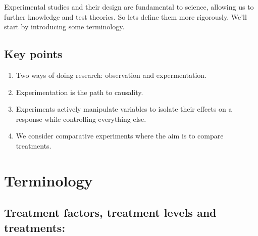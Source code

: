 \documentclass[
  letterpaper,
]{book}
\providecommand{\tightlist}{%
  \setlength{\itemsep}{0pt}\setlength{\parskip}{0pt}}\usepackage{longtable,booktabs,array}
\begin{document}
Experimental studies and their design are fundamental to science,
allowing us to further knowledge and test theories. So lets define them
more rigorously. We'll start by introducing some terminology.

\section*{Key points}\label{key-points}


\begin{enumerate}
\def\labelenumi{\arabic{enumi}.}
\tightlist
\item
  Two ways of doing research: observation and expermentation.
\item
  Experimentation is the path to causality.
\item
  Experiments actively manipulate variables to isolate their effects on
  a response while controlling everything else.
\item
  We consider comparative experiments where the aim is to compare
  treatments.
\end{enumerate}

\chapter{Terminology}\label{terminology}

\section*{\texorpdfstring{\textbf{Treatment factors, treatment levels
and
treatments:}}{Treatment factors, treatment levels and treatments:}}\label{treatment-factors-treatment-levels-and-treatments}

\end{document}
